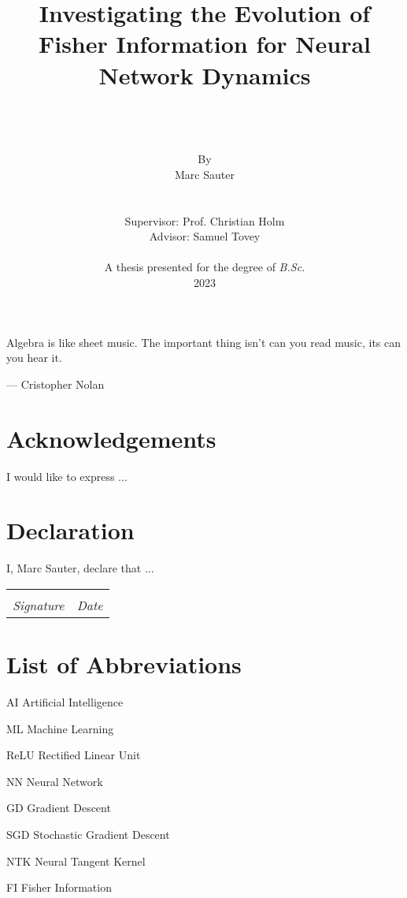 \documentclass[12pt, twoside, a4paper]{report}
\date{}
\title{\textbf{Investigating the Evolution of Fisher Information for Neural Network Dynamics}}
\author{\\
	\\
	\\
	\normalsize By\\
	\Large{Marc Sauter}
	\\
	\\
	\\
	Supervisor: Prof. Christian Holm\\
	Advisor: Samuel Tovey\\
	\\
	\normalsize A thesis presented for the degree of \textit{B.Sc.}
	\\
	2023
}
\begin{document}
	\thispagestyle{headings}
	\maketitle
	\FloatBarrier
	
	\newpage
	\thispagestyle{empty}
	\epigraph{Algebra is like sheet music. The important thing isn't can you read music, its can you hear it.}{--- \textup{Cristopher Nolan}}
	
	\thispagestyle{empty}
	\chapter*{Acknowledgements}
	I would like to express ...
	
	
	\thispagestyle{empty}
	\chapter*{Declaration}
	I, Marc Sauter, declare that ...
	
	\vspace{3cm}
	\noindent\begin{tabular}{ll}
		\makebox[2.5in]{\hrulefill} & \makebox[2.5in]{\hrulefill}\\
		\textit{Signature} & \textit{Date}\\
	\end{tabular}
	
	\thispagestyle{empty}
	\begin{abstract}
		\lipsum[1-2]
		
	\end{abstract}
	\tableofcontents
	\thispagestyle{plain}
	
	\chapter*{List of Abbreviations}
	\begin{abbreviations}
		\item[AI] Artificial Intelligence
		\item[ML] Machine Learning
		\item[ReLU] Rectified Linear Unit
		\item[NN] Neural Network
		\item[GD] Gradient Descent
		\item[SGD] Stochastic Gradient Descent
		\item[NTK] Neural Tangent Kernel
		\item[FI] Fisher Information
	\end{abbreviations}	
\end{document}
